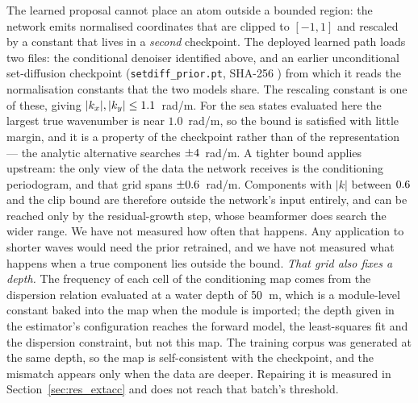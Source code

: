 \documentclass[review]{elsarticle}
\begin{document}
The learned proposal cannot place an atom outside a bounded region: the network
emits normalised coordinates that are clipped to $[-1,1]$ and rescaled by a
constant that lives in a \emph{second} checkpoint. The deployed learned path loads
two files: the conditional denoiser identified above, and an earlier unconditional
set-diffusion checkpoint (\texttt{setdiff\_prior.pt}, SHA-256
\texttt{\PriorCkptSha{}}) from which it reads the normalisation constants that the
two models share. The rescaling constant is one of these, giving
$|k_x|, |k_y| \le 1.1{}$~rad/m. For
the sea states evaluated here the largest true wavenumber is near $1.0$~rad/m, so
the bound is satisfied with little margin, and it is a property of the checkpoint
rather than of the representation --- the analytic alternative searches
$\pm 4{}$~rad/m.
A tighter bound applies upstream: the only view of the data the network receives is
the conditioning periodogram, and that grid spans $\pm 0.6{}$~rad/m. Components with
$|k|$ between $0.6{}$ and the clip bound are therefore outside the network's input
entirely, and can be reached only by the residual-growth step, whose beamformer does
search the wider range. We have not measured how often that happens. Any application to shorter waves would need the prior retrained,
and we have not measured what happens when a true component lies outside the
bound.
\emph{That grid also fixes a depth.} The frequency of each cell of the conditioning
map comes from the dispersion relation evaluated at a water depth of
$50{}$~m, which is a module-level constant baked into the map when the
module is imported; the depth given in the estimator's configuration reaches the
forward model, the least-squares fit and the dispersion constraint, but not this map.
The training corpus was generated at the same depth, so the map is self-consistent
with the checkpoint, and the mismatch appears only when the data are deeper. Repairing
it is measured in Section~\ref{sec:res_extacc} and does not reach that batch's
threshold.
\end{document}
